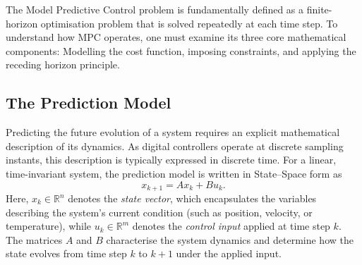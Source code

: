 The Model Predictive Control problem is fundamentally defined as a finite-horizon optimisation problem that is solved repeatedly at each time step. To understand how MPC operates, one must examine its three core mathematical components: Modelling the cost function, imposing constraints, and applying the receding horizon principle.

\subsection{The Prediction Model}
Predicting the future evolution of a system requires an explicit mathematical description of its dynamics. As digital controllers operate at discrete sampling instants, this description is typically expressed in discrete time. For a linear, time-invariant system, the prediction model is written in State–Space form as
\begin{equation}
	x_{k+1} = A x_k + B u_k .
\end{equation}
Here, $x_k \in \mathbb{R}^n$ denotes the \emph{state vector}, which encapsulates the variables describing the system’s current condition (such as position, velocity, or temperature), while $u_k \in \mathbb{R}^m$ denotes the \emph{control input} applied at time step $k$. The matrices $A$ and $B$ characterise the system dynamics and determine how the state evolves from time step $k$ to $k+1$ under the applied input.

